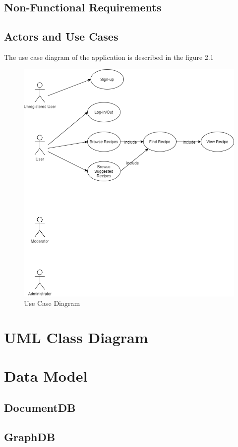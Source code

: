\documentclass[a4paper]{report}
\begin{document}
\subsection{Non-Functional Requirements}

\subsection{Actors and Use Cases}
The use case diagram of the application is described in the figure 2.1 
\begin{figure}[htpb]
	\centering
	\includegraphics[scale=0.5]{img/UseCaseDiagram.png}
	\caption{Use Case Diagram}
\end{figure}
\section{UML Class Diagram}
\section{Data Model}
\subsection{DocumentDB}
\subsection{GraphDB}
\end{document}
